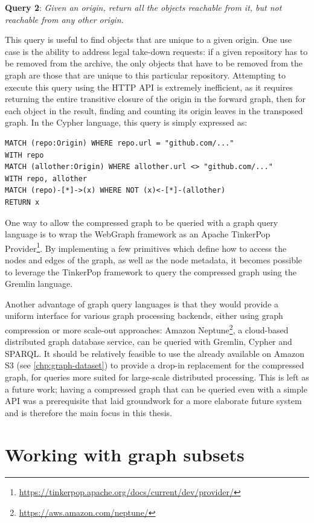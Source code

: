 \textbf{Query 2}: \emph{Given an origin, return all the objects reachable from
it, but not reachable from any other origin.}

This query is useful to find objects that are unique to a given origin. One
use case is the ability to address legal take-down requests: if a given
repository has to be removed from the archive, the only objects that have to be
removed from the graph are those that are unique to this particular repository.
Attempting to execute this query using the HTTP API is extremely inefficient,
as it requires returning the entire transitive closure of the origin in the
forward graph, then for each object in the result, finding and counting its
origin leaves in the transposed graph. In the Cypher language, this query is
simply expressed as:

\begin{verbatim}
MATCH (repo:Origin) WHERE repo.url = "github.com/..."
WITH repo
MATCH (allother:Origin) WHERE allother.url <> "github.com/..."
WITH repo, allother
MATCH (repo)-[*]->(x) WHERE NOT (x)<-[*]-(allother)
RETURN x
\end{verbatim}

One way to allow the compressed graph to be queried with a graph query language
is to wrap the WebGraph framework as an Apache TinkerPop
Provider\footnote{\url{https://tinkerpop.apache.org/docs/current/dev/provider/}}.
By implementing a few primitives which define how to access the nodes and edges
of the graph, as well as the node metadata, it becomes possible to leverage the
TinkerPop framework to query the compressed graph using the Gremlin language.

Another advantage of graph query languages is that they would provide a uniform
interface for various graph processing backends, either using graph compression
or more scale-out approaches: Amazon
Neptune\footnote{\url{https://aws.amazon.com/neptune/}}, a cloud-based
distributed graph database service, can be queried with Gremlin, Cypher and
SPARQL\@. It should be relatively feasible to use the \SWHGD{} already
available on Amazon S3 (see \cref{chp:graph-dataset}) to provide a drop-in
replacement for the compressed graph, for queries more suited for large-scale
distributed processing. This is left as a future work; having a compressed
graph that can be queried even with a simple API was a prerequisite that laid
groundwork for a more elaborate future system and is therefore the main focus
in this thesis.


\section{Working with graph subsets}%
\label{sec:subdatasets}

